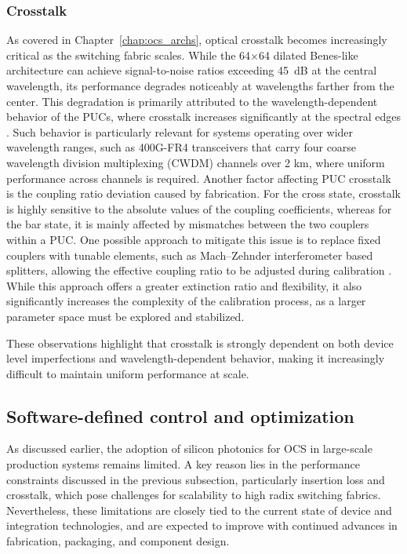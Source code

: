 \subsubsection{Crosstalk} \label{subsec:crosstalk}
As covered in Chapter~\ref{chap:ocs_archs}, optical crosstalk becomes increasingly critical as the switching fabric scales.
While the 64$\times$64 dilated Benes-like architecture can achieve signal-to-noise ratios exceeding 45~dB at the central wavelength, its performance degrades noticeably at wavelengths farther from the center.
This degradation is primarily attributed to the wavelength-dependent behavior of the PUCs, where crosstalk increases significantly at the spectral edges \cite{li2024power}.
Such behavior is particularly relevant for systems operating over wider wavelength ranges, such as 400G-FR4 transceivers that carry four coarse wavelength division multiplexing (CWDM) channels over 2 km, where uniform performance across channels is required.
Another factor affecting PUC crosstalk is the coupling ratio deviation caused by fabrication.
For the cross state, crosstalk is highly sensitive to the absolute values of the coupling coefficients, whereas for the bar state, it is mainly affected by mismatches between the two couplers within a PUC.
One possible approach to mitigate this issue is to replace fixed couplers with tunable elements, such as Mach–Zehnder interferometer based splitters, allowing the effective coupling ratio to be adjusted during calibration \cite{suzuki2015ultra, bao2025ultra, bao2025silicon}.
While this approach offers a greater extinction ratio and flexibility, it also significantly increases the complexity of the calibration process, as a larger parameter space must be explored and stabilized.

These observations highlight that crosstalk is strongly dependent on both device level imperfections and wavelength-dependent behavior, making it increasingly difficult to maintain uniform performance at scale.

\subsection{Software-defined control and optimization} \label{subsec:sd_pip_ocs}
As discussed earlier, the adoption of silicon photonics for OCS in large-scale production systems remains limited.
A key reason lies in the performance constraints discussed in the previous subsection, particularly insertion loss and crosstalk, which pose challenges for scalability to high radix switching fabrics.
Nevertheless, these limitations are closely tied to the current state of device and integration technologies, and are expected to improve with continued advances in fabrication, packaging, and component design.

